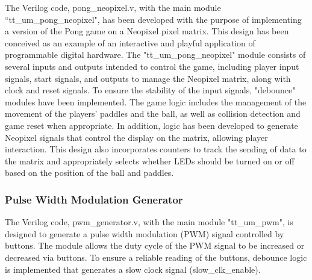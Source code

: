 The Verilog code, pong\_neopixel.v, with the main module ``tt\_um\_pong\_neopixel", has been 
developed with the purpose of implementing a version of the Pong game on a Neopixel pixel 
matrix. This design has been conceived as an example of an interactive and playful application 
of programmable digital hardware. The "tt\_um\_pong\_neopixel" module consists of several 
inputs and outputs intended to control the game, including player input signals, start 
signals, and outputs to manage the Neopixel matrix, along with clock and reset signals. To 
ensure the stability of the input signals, "debounce" modules have been implemented. The game 
logic includes the management of the movement of the players' paddles and the ball, as well as 
collision detection and game reset when appropriate. In addition, logic has been developed to 
generate Neopixel signals that control the display on the matrix, allowing player interaction. 
This design also incorporates counters to track the sending of data to the matrix and 
appropriately selects whether LEDs should be turned on or off based on the position of the 
ball and paddles.

\subsubsection{Pulse Width Modulation Generator}


The Verilog code, pwm\_generator.v, with the main module "tt\_um\_pwm", is designed to 
generate a pulse width modulation (PWM) signal controlled by buttons. The module allows 
the duty cycle of the PWM signal to be increased or decreased via buttons. To ensure a 
reliable reading of the buttons, debounce logic is implemented that 
generates a slow clock signal (slow\_clk\_enable).